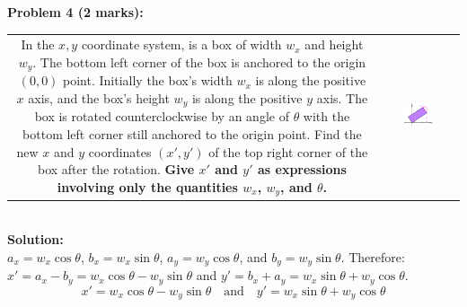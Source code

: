 \documentclass{article}
\newcommand{\dr}[1]{\textcolor{dark_red}{#1}}
\begin{document}
\begin{framed}
\textbf{Problem 4 (2 marks):} \\   
\begin{tabular}{cc}
\parbox{0.5\textwidth}{
In the \(x,y\) coordinate system, is a box of width \(w_x\) and height \(w_y\). The bottom left corner of the box is anchored to the origin \((0,0)\) point. Initially the box's width \(w_x\) is along the positive \(x\) axis, and the box's height \(w_y\) is along the positive \(y\) axis. The box is rotated counterclockwise by an angle of \(\theta\) with the bottom left corner still anchored to the origin point. Find the new \(x\) and \(y\) coordinates \((x',y')\) of the top right corner of the box after the rotation. {\bf Give \(x'\) and \(y'\) as expressions involving only the quantities \(w_x\), \(w_y\), and \(\theta\).} 
} & \parbox{0.4\textwidth}{
\includegraphics[width = 0.4\textwidth]{tilted_box}
}
\end{tabular} \\
\dr{\textbf{Solution:} \\
\(a_x = w_x\cos\theta\), \(b_x = w_x\sin\theta\), \(a_y = w_y\cos\theta\), and \(b_y = w_y\sin\theta\). Therefore: \\   
\(x' = a_x - b_y = w_x\cos\theta - w_y\sin\theta\) and \(y' = b_x + a_y = w_x\sin\theta + w_y\cos\theta\).
\[x' = w_x\cos\theta - w_y\sin\theta \quad\text{and}\quad y' = w_x\sin\theta + w_y\cos\theta\]
}
\end{framed}

\pagebreak
\end{document}

